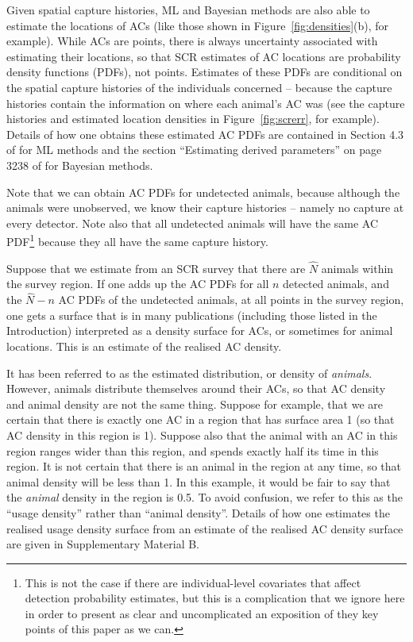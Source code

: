 \documentclass[10pt,a4paper]{article}
\begin{document}
Given spatial capture histories, ML and Bayesian methods are also able to estimate the locations of ACs (like those shown in Figure~\ref{fig:densities}(b), for example). While ACs are points, there is always uncertainty associated with estimating their locations, so that SCR estimates of AC locations are probability density functions (PDFs), not points. Estimates of these PDFs are conditional on the spatial capture histories of the individuals concerned -- because the capture histories contain the information on where each animal's AC was (see the capture histories and estimated location densities in Figure~\ref{fig:screrr}, for example). Details of how one obtains these estimated AC PDFs are contained in Section 4.3 of \cite{Borchers+Efford:08} for ML methods and the section ``Estimating derived parameters'' on page 3238 of \cite{Royle+al:09b} for Bayesian methods.

Note that we can obtain AC PDFs for undetected animals, because although the animals were unobserved, we know their capture histories -- namely no capture at every detector. Note also that all undetected animals will have the same AC PDF\footnote{This is not the case if there are individual-level covariates that affect detection probability estimates, but this is a complication that we ignore here in order to present as clear and uncomplicated an exposition of they key points of this paper as we can.} because they all have the same capture history. 

Suppose that we estimate from an SCR survey that there are $\hat{N}$ animals within the survey region. If one adds up the AC PDFs for all $n$ detected animals, and the $\hat{N}-n$ AC PDFs of the undetected animals, at all points in the survey region, one gets a surface that is in many publications (including those listed in the Introduction) interpreted as a density surface for ACs, or sometimes for animal locations. This is an estimate of the realised AC density.

It has been referred to as the estimated distribution, or density of \textit{animals}. However, animals distribute themselves around their ACs, so that AC density and animal density are not the same thing. Suppose for example, that we are certain that there is exactly one AC in a region that has surface area 1 (so that AC density in this region is 1). Suppose also that the animal with an AC in this region ranges wider than this region, and spends exactly half its time in this region. It is not certain that there is an animal in the region at any time, so that animal density will be less than 1. In this example, it would be fair to say that the \textit{animal} density in the region is 0.5. To avoid confusion, we refer to this as the ``usage density'' rather than ``animal density''. Details of how one estimates the realised usage density surface from an estimate of the realised AC density surface are given in Supplementary Material B.
\end{document}
